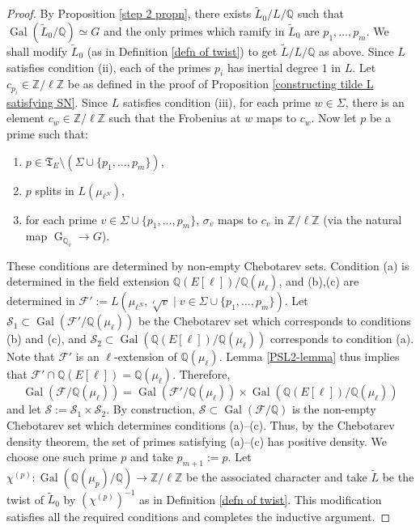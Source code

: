 \documentclass[11pt,reqno]{amsart}
\newcommand{\cF}{\mathcal{F}}
\newcommand{\Z}{\mathbb{Z}}
\newcommand{\Q}{\mathbb{Q}}
\newcommand{\cS}{\mathcal{S}}
\newcommand{\op}[1]{\operatorname{#1}}
\numberwithin{equation}{section}
\begin{document}
\begin{proof}
    \par By Proposition \ref{step 2 propn}, there exists $\widetilde{L}_0/L/\Q$ such that $\op{Gal}(\widetilde{L}_0/\Q)\simeq G$ and the only primes which ramify in $\widetilde{L}_0$ are $p_1, \dots, p_m$. We shall modify $\widetilde{L}_0$ (as in Definition \ref{defn of twist}) to get $\widetilde{L}/L/\Q$ as above. Since $L$ satisfies condition (ii), each of the primes $p_i$ has inertial degree $1$ in $L$. Let $c_{p_i}\in \Z/\ell \Z$ be as defined in the proof of Proposition \ref{constructing tilde L satisfying SN}. Since $L$ satisfies condition (iii), for each prime $w\in \Sigma$, there is an element $c_w\in \Z/\ell\Z$ such that the Frobenius at $w$ maps to $c_w$. Now let $p$ be a prime such that:
    \begin{enumerate}[label=(\alph*)]
        \item $p\in \mathfrak{T}_E\setminus(\Sigma\cup \{p_1, \dots, p_m\})$, 
        \item $p$ splits in $L(\mu_{\ell^N})$, 
        \item for each prime $v\in \Sigma\cup \{p_1, \dots, p_m\}$, $\sigma_v$ maps to $c_v$ in $\Z/\ell\Z$ (via the natural map $\op{G}_{\Q_v}\rightarrow G$). 
    \end{enumerate}
    These conditions are determined by non-empty Chebotarev sets. Condition (a) is determined in the field extension $\Q(E[\ell])/\Q(\mu_\ell)$, and (b),(c) are determined in $\cF':=L(\mu_{\ell^N}, \sqrt[\ell]{v}\mid v\in \Sigma \cup \{p_1, \dots, p_m\} )$. Let $\mathcal{S}_1\subset \op{Gal}(\cF'/\Q(\mu_\ell))$ be the Chebotarev set which corresponds to conditions (b) and (c), and $\mathcal{S}_2 \subset\op{Gal}(\Q(E[\ell])/\Q(\mu_\ell))$ corresponds to condition (a). Note that $\cF'$ is an $\ell$-extension of $\Q(\mu_\ell)$.  Lemma \ref{PSL2-lemma} thus implies that $\cF'\cap \Q(E[\ell])=\Q(\mu_\ell)$. Therefore, 
    \[\op{Gal}\left(\cF/\Q(\mu_\ell)\right)=\op{Gal}\left(\cF'/\Q(\mu_\ell)\right)\times \op{Gal}\left(\Q(E[\ell])/\Q(\mu_\ell)\right)\] and let $\cS:=\cS_{1} \times \cS_{2}$. By construction, $\cS\subset \op{Gal}(\cF/\Q)$ is the non-empty Chebotarev set which determines conditions (a)--(c). Thus, by the Chebotarev density theorem, the set of primes satisfying (a)--(c) has positive density. We choose one such prime $p$ and take $p_{m+1}:=p$. Let $\chi^{(p)}: \op{Gal}(\Q(\mu_p)/\Q)\rightarrow \Z/\ell \Z$ be the associated character and take $\widetilde{L}$ be the twist of $\widetilde{L}_0$ by $(\chi^{(p)})^{-1}$ as in Definition \ref{defn of twist}. This modification satisfies all the required conditions and completes the inductive argument. 
\end{proof}
\end{document}
